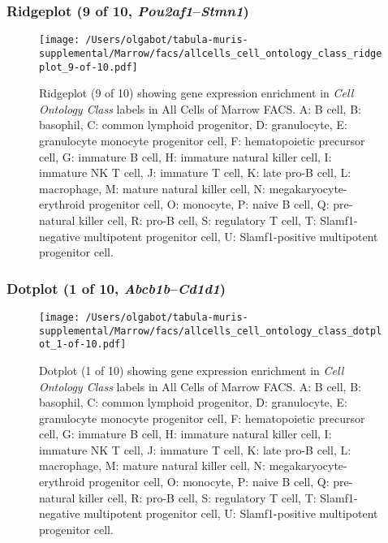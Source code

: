 \subsubsection{Ridgeplot (9 of 10, \emph{Pou2af1}--\emph{Stmn1})}
\begin{figure}[h]
\centering
\texttt{[image: /Users/olgabot/tabula-muris-supplemental/Marrow/facs/allcells\_cell\_ontology\_class\_ridgeplot\_9-of-10.pdf]}

\caption{ Ridgeplot (9 of 10)  showing gene expression enrichment in \emph{Cell Ontology Class} labels in All Cells of Marrow FACS. A: B cell, B: basophil, C: common lymphoid progenitor, D: granulocyte, E: granulocyte monocyte progenitor cell, F: hematopoietic precursor cell, G: immature B cell, H: immature natural killer cell, I: immature NK T cell, J: immature T cell, K: late pro-B cell, L: macrophage, M: mature natural killer cell, N: megakaryocyte-erythroid progenitor cell, O: monocyte, P: naive B cell, Q: pre-natural killer cell, R: pro-B cell, S: regulatory T cell, T: Slamf1-negative multipotent progenitor cell, U: Slamf1-positive multipotent progenitor cell.}
\end{figure}


\clearpage

\subsubsection{Dotplot (1 of 10, \emph{Abcb1b}--\emph{Cd1d1})}
\begin{figure}[h]
\centering
\texttt{[image: /Users/olgabot/tabula-muris-supplemental/Marrow/facs/allcells\_cell\_ontology\_class\_dotplot\_1-of-10.pdf]}

\caption{ Dotplot (1 of 10)  showing gene expression enrichment in \emph{Cell Ontology Class} labels in All Cells of Marrow FACS. A: B cell, B: basophil, C: common lymphoid progenitor, D: granulocyte, E: granulocyte monocyte progenitor cell, F: hematopoietic precursor cell, G: immature B cell, H: immature natural killer cell, I: immature NK T cell, J: immature T cell, K: late pro-B cell, L: macrophage, M: mature natural killer cell, N: megakaryocyte-erythroid progenitor cell, O: monocyte, P: naive B cell, Q: pre-natural killer cell, R: pro-B cell, S: regulatory T cell, T: Slamf1-negative multipotent progenitor cell, U: Slamf1-positive multipotent progenitor cell.}
\end{figure}


\clearpage

